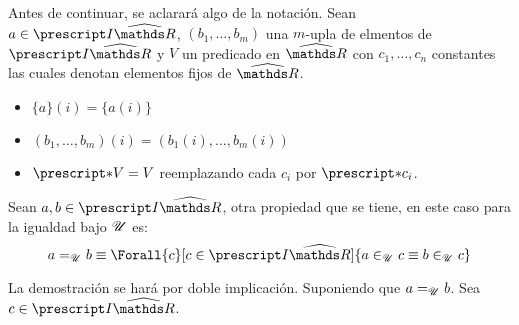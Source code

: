 Antes de continuar, se aclarará algo de la notación. Sean $a\in\IRh$,
$(b_1,\dots,b_m)$ una $m$-upla de elmentos de $\IRh$ y $V$ un predicado
en $\Rh$ con $c_1,\dots,c_n$ constantes las cuales denotan elementos
fijos de $\Rh$.
\begin{itemize}
  \item $\{a\}(i) = \{a(i)\}$
  \item $(b_1,\dots,b_m)(i) = (b_1(i),\dots,b_m(i))$
  \item $\st{V} = V$ reemplazando cada $c_i$ por $\st{c_i}$.
\end{itemize}
Sean $a,b\in \IRh$, otra propiedad que se tiene, en este caso para
la igualdad bajo $\mathscr{U}$ es:
\[a \equ b \equiv \Forall{c}[c\in\IRh]{a\inu c \equiv b \inu c}\]
\begin{demo}
  La demostración se hará por doble implicación.
  Suponiendo que $a=_{\mathscr{U}} b$. Sea $c\in\IRh$.
  \begin{center}
  \end{center}


\end{demo}
